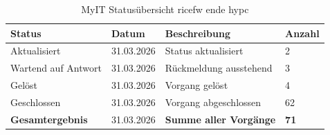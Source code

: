 
\begin{table}[htpb]
    \begin{tabularx}{\textwidth}{|l|l|X|l|}\rowcolor[HTML]{9B9B9B}
        \textbf{Status} & \textbf{Datum} & \textbf{Beschreibung}                & \textbf{Anzahl} \\ \hline
        Aktualisiert        & 31.03.2026 & Status aktualisiert                  & 2  \\ \hline
        Wartend auf Antwort & 31.03.2026 & Rückmeldung ausstehend               & 3  \\ \hline
        Gelöst              & 31.03.2026 & Vorgang gelöst                       & 4  \\ \hline
        Geschlossen         & 31.03.2026 & Vorgang abgeschlossen                & 62 \\ \hline
        \textbf{Gesamtergebnis} & 31.03.2026 & \textbf{Summe aller Vorgänge}     & \textbf{71} \\ \hline
    \end{tabularx}
    \caption{MyIT Statusübersicht \acrshort{ricefw} ende \acrshort{hypc}}
     \label{tab:statusuebersicht}
\end{table}



